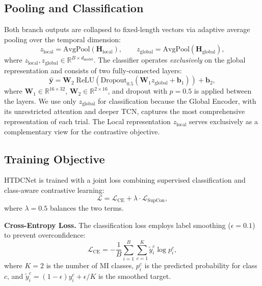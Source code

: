 \documentclass[conference]{IEEEtran}
\begin{document}
\subsection{Pooling and Classification}
Both branch outputs are collapsed to fixed-length vectors via adaptive average pooling over the temporal dimension:
\begin{equation}
    z_{\text{local}} = \text{AvgPool}(\mathbf{H}_{\text{local}}), \qquad
    z_{\text{global}} = \text{AvgPool}(\mathbf{H}_{\text{global}}),
\end{equation}
where $z_{\text{local}}, z_{\text{global}} \in \mathbb{R}^{B \times d_{\text{model}}}$.
The classifier operates \emph{exclusively} on the global representation and consists of two fully-connected layers:
\begin{equation}
    \hat{\mathbf{y}} = \mathbf{W}_2 \;\text{ReLU}(\text{Dropout}_{0.5}(\mathbf{W}_1 z_{\text{global}} + \mathbf{b}_1)) + \mathbf{b}_2,
\end{equation}
where $\mathbf{W}_1 \in \mathbb{R}^{16 \times 32}$, $\mathbf{W}_2 \in \mathbb{R}^{2 \times 16}$, and dropout with $p=0.5$ is applied between the layers.
We use only $z_{\text{global}}$ for classification because the Global Encoder, with its unrestricted attention and deeper TCN, captures the most comprehensive representation of each trial.
The Local representation $z_{\text{local}}$ serves exclusively as a complementary view for the contrastive objective.

\subsection{Training Objective}
HTDCNet is trained with a joint loss combining supervised classification and class-aware contrastive learning:
\begin{equation}
    \mathcal{L} = \mathcal{L}_{\text{CE}} + \lambda \cdot \mathcal{L}_{\text{SupCon}},
\end{equation}
where $\lambda = 0.5$ balances the two terms.

\textbf{Cross-Entropy Loss.}
The classification loss employs label smoothing ($\epsilon = 0.1$) to prevent overconfidence:
\begin{equation}
    \mathcal{L}_{\text{CE}} = -\frac{1}{B}\sum_{i=1}^{B} \sum_{c=1}^{K} \tilde{y}_i^c \log p_i^c,
\end{equation}
where $K=2$ is the number of MI classes, $p_i^c$ is the predicted probability for class $c$, and $\tilde{y}_i^c = (1 - \epsilon) y_i^c + \epsilon / K$ is the smoothed target.
\end{document}
